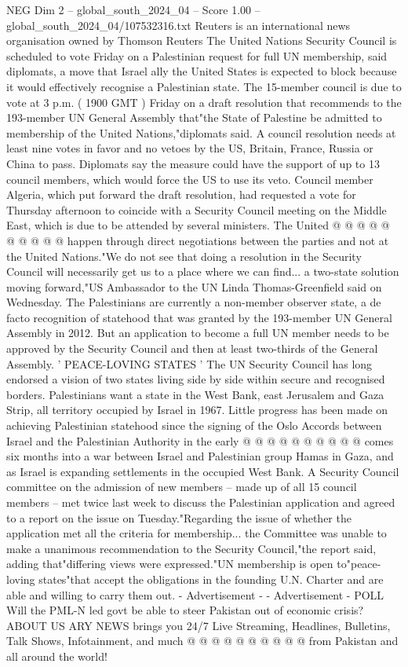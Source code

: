 \begin{textsample}{NEG Dim 2 – global\_south\_2024\_04 – Score 1.00 – global\_south\_2024\_04/107532316.txt}  \label{ex:f2_neg_298}
Reuters is an international news organisation owned by Thomson Reuters The United Nations Security Council is scheduled to vote Friday on a Palestinian request for full UN membership, said diplomats, a move that Israel ally the United States is expected to block because it would effectively recognise a Palestinian state.
The 15-member council is due to vote at 3 p.m. ( 1900 GMT ) Friday on a draft resolution that recommends to the 193-member UN General Assembly that"the State of Palestine be admitted to membership of the United Nations,"diplomats said.
A council resolution needs at least nine votes in favor and no vetoes by the US, Britain, France, Russia or China to pass.
Diplomats say the measure could have the support of up to 13 council members, which would force the US to use its veto.
Council member Algeria, which put forward the draft resolution, had requested a vote for Thursday afternoon to coincide with a Security Council meeting on the Middle East, which is due to be attended by several ministers.
The United @ @ @ @ @ @ @ @ @ @ happen through direct negotiations between the parties and not at the United Nations."We do not see that doing a resolution in the Security Council will necessarily get us to a place where we can find... a two-state solution moving forward,"US Ambassador to the UN Linda Thomas-Greenfield said on Wednesday.
The Palestinians are currently a non-member observer state, a de facto recognition of statehood that was granted by the 193-member UN General Assembly in 2012.
But an application to become a full UN member needs to be approved by the Security Council and then at least two-thirds of the General Assembly. ' PEACE-LOVING STATES ' The UN Security Council has long endorsed a vision of two states living side by side within secure and recognised borders.
Palestinians want a state in the West Bank, east Jerusalem and Gaza Strip, all territory occupied by Israel in 1967.
Little progress has been made on achieving Palestinian statehood since the signing of the Oslo Accords between Israel and the Palestinian Authority in the early @ @ @ @ @ @ @ @ @ @ comes six months into a war between Israel and Palestinian group Hamas in Gaza, and as Israel is expanding settlements in the occupied West Bank.
A Security Council committee on the admission of new members -- made up of all 15 council members -- met twice last week to discuss the Palestinian application and agreed to a report on the issue on Tuesday."Regarding the issue of whether the application met all the criteria for membership... the Committee was unable to make a unanimous recommendation to the Security Council,"the report said, adding that"differing views were expressed."UN membership is open to"peace-loving states"that accept the obligations in the founding U.N.
Charter and are able and willing to carry them out. - Advertisement - - Advertisement - POLL Will the PML-N led govt be able to steer Pakistan out of economic crisis?
ABOUT US ARY NEWS brings you 24/7 Live Streaming, Headlines, Bulletins, Talk Shows, Infotainment, and much @ @ @ @ @ @ @ @ @ @ from Pakistan and all around the world!

\end{textsample}
